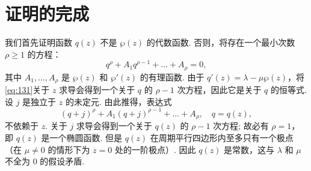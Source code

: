 \section{证明的完成}\label{sec:4.4}

我们首先证明函数 $q(z)$ 不是 $\wp(z)$ 的代数函数. 否则，将存在一个最小次数 $\rho \ge 1$ 的方程：
\begin{equation}
q^{\rho} + A_1 q^{\rho-1} + \dots + A_{\rho} = 0, \tag{131}\label{eq:131}
\end{equation}
其中 $A_1, \dots, A_\rho$ 是 $\wp(z)$ 和 $\wp'(z)$ 的有理函数. 由于 $q'(z) = \lambda - \mu \wp(z)$，将\eqref{eq:131}关于 $z$ 求导会得到一个关于 $q$ 的 $\rho - 1$ 次方程，因此它是关于 $q$ 的恒等式. 设 $j$ 是独立于 $z$ 的未定元. 由此推得，表达式
\[
(q+j)^{\rho} + A_1(q+j)^{\rho-1} + \dots + A_{\rho}, \quad q=q(z),
\]
不依赖于 $z$. 关于 $j$ 求导会得到一个关于 $q(z)$ 的 $\rho - 1$ 次方程; 故必有 $\rho = 1$，即 $q(z)$ 是一个椭圆函数. 但是 $q(z)$ 在周期平行四边形内至多只有一个极点（在 $\mu \neq 0$ 的情形下为 $z=0$ 处的一阶极点）. 因此 $q(z)$ 是常数，这与 $\lambda$ 和 $\mu$ 不全为 $0$ 的假设矛盾.

